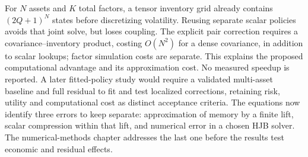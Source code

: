For $N$ assets and $K$ total factors, a tensor inventory grid already contains $(2Q+1)^N$ states before discretizing volatility. Reusing separate scalar policies avoids that joint solve, but loses coupling. The explicit pair correction requires a covariance--inventory product, costing $O(N^2)$ for a dense covariance, in addition to scalar lookups; factor simulation costs are separate. This explains the proposed computational advantage and its approximation cost. No measured speedup is reported. A later fitted-policy study would require a validated multi-asset baseline and full residual to fit and test localized corrections, retaining risk, utility and computational cost as distinct acceptance criteria.
The equations now identify three errors to keep separate: approximation of memory by a finite lift, scalar compression within that lift, and numerical error in a chosen HJB solver. The numerical-methods chapter addresses the last one before the results test economic and residual effects.
